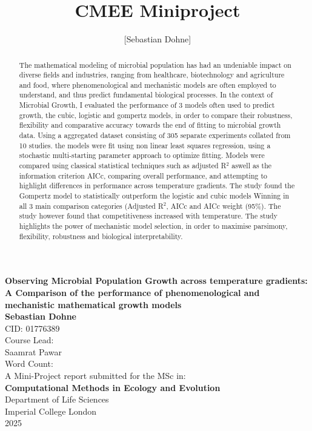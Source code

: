 \documentclass[11pt]{article}
\title{CMEE Miniproject}
\author{[Sebastian Dohne]}
\date{}
\begin{document}
\begin{titlepage}
    \begin{center}
    \vspace{1.75cm}
    \Large
        \textbf{Observing Microbial Population Growth across temperature gradients: A Comparison of the performance of phenomenological and mechanistic mathematical growth models }
        \vspace{2.5cm}\\
        \textbf{Sebastian Dohne}\\
        CID: 01776389\\
        \vspace{1.5cm}
        \large
        Course Lead:\\
        Saamrat Pawar\\
        \vspace{1.5cm}
        Word Count:  \\
        \vspace{4cm}
        A Mini-Project report submitted for the MSc in:\\ \textbf{Computational Methods in Ecology and Evolution}\\
        \vspace{1.5cm}
        Department of Life Sciences\\
        Imperial College London\\
        2025
    \end{center}
\end{titlepage}

\begin{abstract}
The mathematical modeling of microbial population has had an undeniable impact on diverse fields and industries, ranging from healthcare, biotechnology and agriculture and food, where phenomenological and mechanistic models are often employed to understand, and thus predict fundamental biological processes. In the context of Microbial Growth, I evaluated the performance of 3 models often used to predict growth, the cubic, logistic and gompertz models, in order to compare their robustness, flexibility and comparative accuracy towards the end of fitting to microbial growth data. Using a aggregated dataset consisting of 305 separate experiments collated from 10 studies. the models were fit using non linear least squares regression, using a stochastic multi-starting parameter approach to optimize fitting. Models were compared using classical statistical techniques such as adjusted R$^2$ aswell as the information criterion AICc, comparing overall performance, and attempting to highlight differences in performance across temperature gradients. The study found the Gompertz model to statistically outperform the logistic and cubic models Winning in all 3 main comparison categories (Adjusted R$^2$, AICc and AICc weight (95\%). The study however found that competitiveness increased with temperature. The study highlights the power of mechanistic model selection, in order to maximise parsimony, flexibility, robustness and biological interpretability.    
\end{abstract}
\end{document}
